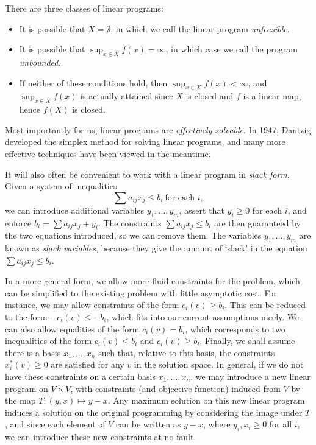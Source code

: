     There are three classes of linear programs:
    \begin{itemize}
        \item It is possible that $X = \emptyset$, in which we call the linear program \emph{unfeasible}.

        \item It is possible that $\sup_{x \in X} f(x) = \infty$, in which case we call the program \emph{unbounded}.

        \item If neither of these conditions hold, then $\sup_{x \in X} f(x) < \infty$, and $\sup_{x \in X} f(x)$ is actually attained since $X$ is closed and $f$ is a linear map, hence $f(X)$ is closed.
    \end{itemize}
    Most importantly for us, linear programs are \emph{effectively solvable}. In 1947, Dantzig developed the simplex method for solving linear programs, and many more effective techniques have been viewed in the meantime.

    It will also often be convenient to work with a linear program in \emph{slack form}. Given a system of inequalities
    \[ \sum a_{ij} x_j \leq b_i\ \text{for each $i$}, \]
    we can introduce additional variables $y_1, \dots, y_m$, assert that $y_i \geq 0$ for each $i$, and enforce $b_i = \sum a_{ij} x_j + y_i$. The constraints $\sum a_{ij} x_j \leq b_i$ are then guaranteed by the two equations introduced, so we can remove them. The variables $y_1, \dots, y_m$ are known as \emph{slack variables}, because they give the amount of `slack' in the equation $\sum a_{ij} x_j \leq b_i$.



    In a more general form, we allow more fluid constraints for the problem, which can be simplified to the existing problem with little asymptotic cost. For instance, we may allow constraints of the form $c_i(v) \geq b_i$. This can be reduced to the form $-c_i(v) \leq -b_i$, which fits into our current assumptions nicely. We can also allow equalities of the form $c_i(v) = b_i$, which corresponds to two inequalities of the form $c_i(v) \leq b_i$ and $c_i(v) \geq b_i$. Finally, we shall assume there is a basis $x_1, \dots, x_n$ such that, relative to this basis, the constraints $x_i^*(v) \geq 0$ are satisfied for any $v$ in the solution space. In general, if we do not have these constraints on a certain basis $x_1, \dots, x_n$, we may introduce a new linear program on $V \times V$, with constraints (and objective function) induced from $V$ by the map $T: (y,x) \mapsto y-x$. Any maximum solution on this new linear program induces a solution on the original programming by considering the image under $T$, and since each element of $V$ can be written as $y - x$, where $y_i, x_i \geq 0$ for all $i$, we can introduce these new constraints at no fault.


